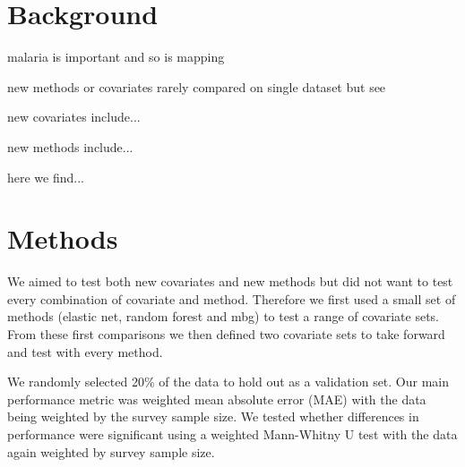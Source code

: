 \documentclass{bmcart}
\begin{document}


\section*{Background}

malaria is important and so is mapping


new methods or covariates rarely compared on single dataset
but see

new covariates include...

new methods include...

here we find...


\section*{Methods}


We aimed to test both new covariates and new methods but did not want to test every combination of covariate and method.
Therefore we first used a small set of methods (elastic net, random forest and mbg) to test a range of covariate sets.
From these first comparisons we then defined two covariate sets to take forward and test with every method.



We randomly selected 20\% of the data to hold out as a validation set.
Our main performance metric was weighted mean absolute error (MAE) with the data being weighted by the survey sample size.
We tested whether differences in performance were significant using a weighted Mann-Whitny U test with the data again weighted by survey sample size.
\end{document}
